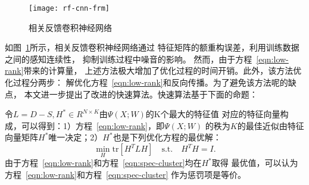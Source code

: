 \begin{figure}[ht]
    \texttt{[image: rf-cnn-frm]}
    \caption{相关反馈卷积神经网络}\label{fig:rf-cnn-frm}
\end{figure}
如图~\ref{fig:rf-cnn-frm}所示，相关反馈卷积神经网络通过
特征矩阵的额重构误差，利用训练数据之间的感知连续性，
抑制训练过程中噪音的影响。
然而，由于方程~\eqref{eqn:low-rank}带来的计算量，
上述方法极大增加了优化过程的时间开销。此外，该方法优化过程分两步：
解优化方程~\eqref{eqn:low-rank}和反向传播。为了避免该方法呢的缺点，
本文进一步提出了改进的快速算法。快速算法基于下面的命题：
\begin{proposition}\label{prop:lowrank-spec}
    令$L=D-S, H^* \in R^{N\times K}$由$\Psi(X;W)$的K个最大的特征值
    对应的特征向量构成，可以得到：1）方程~\eqref{eqn:low-rank}，即$\Psi(X;W)$
    的秩为$K$的最佳近似由特征向量矩阵$H^*$唯一决定；2）$H^*$也是下列优化方程的最优解：
    \begin{equation}
        \label{eqn:spec-cluster}
        \min_H \text{tr}[H^TLH] \quad \text{s.t.} \quad H^TH = I.
    \end{equation}
    由于方程~\eqref{eqn:low-rank}和方程~\eqref{eqn:spec-cluster}均在$H^*$取得
    最优值，可以认为方程~\eqref{eqn:low-rank}和方程~\eqref{eqn:spec-cluster}
    作为惩罚项是等价。
\end{proposition}
